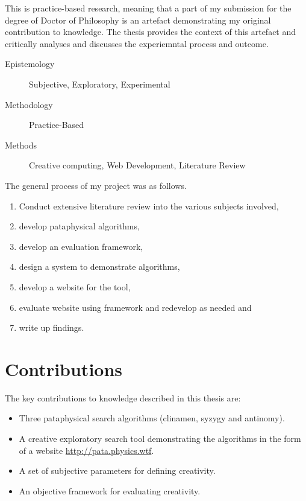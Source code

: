 This is practice-based research, meaning that a part of my submission for the degree of Doctor of Philosophy is an artefact demonstrating my original contribution to knowledge. The thesis provides the context of this artefact and critically analyses and discusses the experiemntal process and outcome.

\begin{description}
  \item [Epistemology] Subjective, Exploratory, Experimental
  \item [Methodology] Practice-Based
  \item [Methods] Creative computing, Web Development, Literature Review
\end{description}


The general process of my project was as follows.

\begin{enumerate}
  \item Conduct extensive literature review into the various subjects involved,
  \item develop pataphysical algorithms,
  \item develop an evaluation framework,
  \item design a system to demonstrate algorithms,
  \item develop a website for the tool,
  \item evaluate website using framework and redevelop as needed and
  \item write up findings.
\end{enumerate}


\section{Contributions}

The key contributions to knowledge described in this thesis are:

\begin{itemize}
  \item Three pataphysical search algorithms (clinamen, syzygy and antinomy).
  \item A creative exploratory search tool demonstrating the algorithms in the form of a website \url{http://pata.physics.wtf}.
  \item A set of subjective parameters for defining creativity.
  \item An objective framework for evaluating creativity.
\end{itemize}

